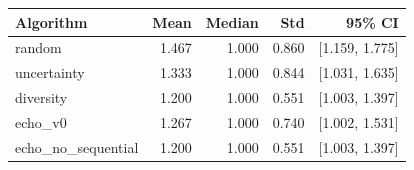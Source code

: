 \begin{tabular}{lrrrr}
\hline
Algorithm & Mean & Median & Std & 95\% CI \\
\hline
random & 1.467 & 1.000 & 0.860 & [1.159, 1.775] \\
uncertainty & 1.333 & 1.000 & 0.844 & [1.031, 1.635] \\
diversity & 1.200 & 1.000 & 0.551 & [1.003, 1.397] \\
echo\_v0 & 1.267 & 1.000 & 0.740 & [1.002, 1.531] \\
echo\_no\_sequential & 1.200 & 1.000 & 0.551 & [1.003, 1.397] \\
\hline
\end{tabular}
